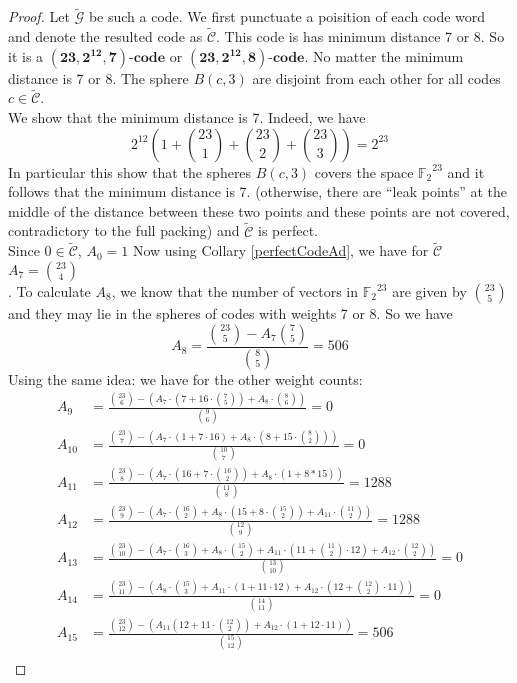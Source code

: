 \documentclass{article}
\numberwithin{equation}{theorem}
\numberwithin{figure}{theorem}
\newcommand{\cCodes}{\ensuremath{\widetilde{\mathscr{G}}}}
\newcommand{\tildcCodes}{\ensuremath{\widetilde{\mathscr{C}}}}
\newcommand{\code}[3]{\ensuremath{\bm{(#1,#2,#3)\mbox{-}code}}}
\newcommand{\ftwoN}[1]{\ensuremath{\mathbb{F}_2}^{#1}}
\begin{document}
\begin{proof}
Let {\cCodes} be such a code. We first punctuate a poisition 
of each code word and denote the resulted code as {\tildcCodes}.
This code is has minimum distance 7 or 8. So it is a {\code{23}{2^{12}}{7}} or {\code{23}{2^{12}}{8}}. No matter the minimum distance is 7 or 8. The sphere $B(c,3)$ are disjoint from each other for all codes $c \in \tildcCodes$.\\
We show that the minimum distance is 7.  Indeed, we have
\[
	2^{12}(1 + \binom{23}{1} + \binom{23}{2} + \binom{23}{3}) = 2^{23}
\]
In particular this show that the spheres $B(c,3)$ covers the space {$\ftwoN{23}$} and it follows that the minimum distance is 7. (otherwise, there are ``leak points'' at the middle of the distance between these two points and these points are not covered, contradictory to the full packing) and {\tildcCodes} is perfect.\\
Since $0 \in \tildcCodes$, $A_0 = 1$
Now using Collary \ref{perfectCodeAd}, we have for {\tildcCodes} $A_7 = \binom{23}{4}$\\.
To calculate $A_8$, we know that the number of vectors in $\ftwoN{23}$ are given by $\binom{23}{5}$ and they may lie in the spheres of codes with weights 7 or 8. So we have
\[
	A_8 = \frac{\binom{23}{5} - A_7\binom{7}{5}}{\binom{8}{5}} = 506
\]
Using the same idea: we have for the other weight counts:
	\begin{align*}
		A_9 &= \frac{\binom{23}{6} - (A_7 \cdot(7 + 16 \cdot \binom{7}{5}) + A_8\cdot \binom{8}{6})}{\binom{9}{6}} = 0\\
		A_{10} &= \frac{\binom{23}{7} - (A_7\cdot(1 + 7\cdot 16) + A_8\cdot(8 + 15 \cdot \binom{8}{2}))}{\binom{10}{7}} = 0 \\
		A_{11} &= \frac{\binom{23}{8} - (A_7\cdot(16 + 7\cdot \binom{16}{2}) + A_8\cdot(1 + 8 * 15))}{\binom{11}{8}} = 1288\\
		A_{12} &= \frac{\binom{23}{9} - (A_7\cdot\binom{16}{2} + A_8\cdot(15 + 8 \cdot \binom{15}{2}) + A_{11}\cdot\binom{11}{2})}{\binom{12}{9}} = 1288 \\
		A_{13} &= \frac{\binom{23}{10} - (A_7\cdot\binom{16}{3} + A_8 \cdot \binom{15}{2} + A_{11} \cdot(11 + \binom{11}{2} \cdot 12) + A_{12} \cdot \binom{12}{2})}{\binom{13}{10}} = 0\\
		A_{14} &= \frac{\binom{23}{11} - (A_8 \cdot \binom{15}{3} + A_{11} \cdot(1 + 11 \cdot 12) + A_{12} \cdot(12 + \binom{12}{2} \cdot 11))}{\binom{14}{11}} = 0\\
		A_{15} &= \frac{\binom{23}{12} - (A_{11}(12 + 11 \cdot \binom{12}{2}) + A_{12}\cdot(1 + 12\cdot 11))}{\binom{15}{12}} = 506 \\

\end{align*}
\end{proof}
\end{document}
